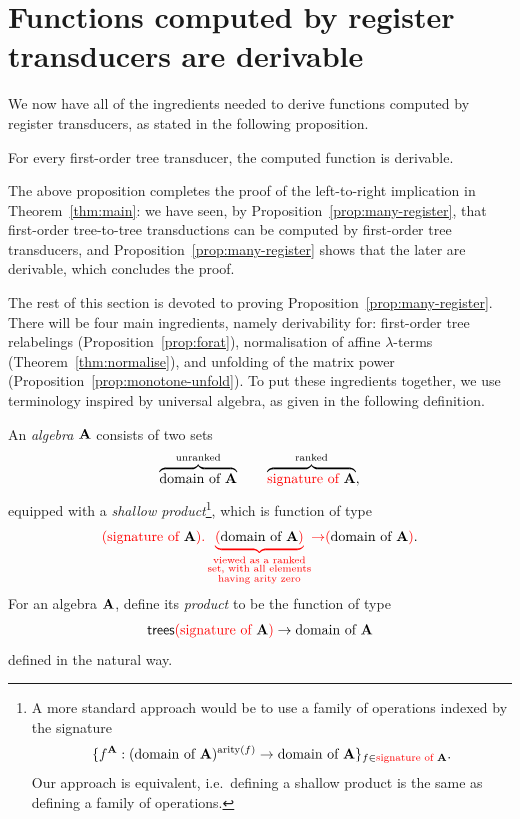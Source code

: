 
\section{Functions computed by register transducers are derivable}
\label{sec:stt-derivable}
We now  have all of the ingredients needed to derive functions computed by register transducers, as stated in the following proposition.
\begin{proposition}
    \label{prop:many-register} 
For every first-order  tree transducer, the computed function is derivable. 
\end{proposition}
The above proposition  completes the proof of the left-to-right implication in Theorem~\ref{thm:main}: we have seen, by Proposition~\ref{prop:many-register}, that first-order tree-to-tree transductions can be computed by first-order tree transducers, and Proposition~\ref{prop:many-register} shows that the later are derivable, which concludes the proof.

The rest of this section is devoted to proving Proposition~\ref{prop:many-register}. There will be four main ingredients, namely derivability for: first-order tree relabelings (Proposition~\ref{prop:forat}), normalisation of affine $\lambda$-terms (Theorem~\ref{thm:normalise}), and unfolding of the matrix power (Proposition~\ref{prop:monotone-unfold}).
\label{sec:proof-of-prop} 
To put these ingredients together,  we use  terminology inspired by universal algebra, as given in the following definition. 

\begin{definition}
    An \emph{algebra} ${\color{black}\mathbf A}$ consists of two sets 
    \begin{align*}
    \overbrace{{\color{black}\text{domain of }}{\color{black}\mathbf A}}^{\text{unranked}} \qquad \overbrace{{\color{red}{\text{signature of }}}{\color{black}\mathbf A}}^{\text{ranked}},
    \end{align*}
equipped with a  \emph{shallow product}\footnote{
    A more standard approach would be to use a family of operations indexed by the signature
    \begin{align*}
    \{f^{\color{black}\mathbf A} : ({\color{black}\text{domain of }}{\color{black}\mathbf A})^{\mathrm{arity}(f)} \to {\color{black}\text{domain of }}{\color{black}\mathbf A}\}_{f \in {\color{red}{\text{signature of }}}{\color{black}\mathbf A}}.
    \end{align*}
   Our approach is equivalent, i.e.~defining a shallow product is the same as defining a family of operations.
}, which is function of type
\begin{align*}
 {\color{red}{({\color{red}{\text{signature of }}}{\color{black}\mathbf A}) . \underbrace{({\color{black}\text{domain of }}{\color{black}\mathbf A})}_{\substack{\text{viewed as a ranked}\\ \text{set, with all elements}\\ \text{having arity zero}}}}} {\color{red}{\to}} {\color{red}{(}}{\color{black}\text{domain of }}{\color{black}\mathbf A}{\color{red}{)}}.
\end{align*}
    For an algebra ${\color{black}\mathbf A}$, define its \emph{product} to be the function of type
    \begin{align*}
        \mathsf {trees} {\color{red}{(}}{\color{red}{\text{signature of }}}{\color{black}\mathbf A}{\color{red}{)}} \to {\color{black}\text{domain of }}{\color{black}\mathbf A}
    \end{align*}
    defined in the natural way.
\end{definition}


